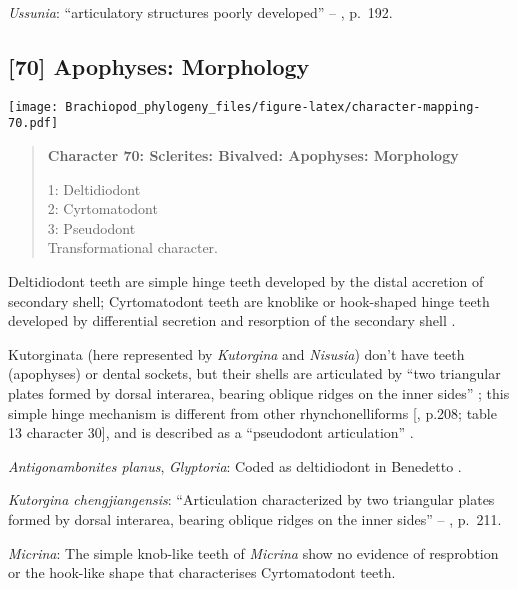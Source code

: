 \documentclass[openany]{book}
\theoremstyle{definition}
\theoremstyle{definition}
\theoremstyle{definition}
\theoremstyle{remark}
\begin{document}
\hypertarget{Ussunia-coding-69}{}
\emph{Ussunia}: ``articulatory structures poorly developed'' --
\citet{Williams2000LinguliformeaCraniiformea}, p.~192.

\subsection*{{[}70{]} Apophyses: Morphology}\label{apophyses-morphology}

\texttt{[image: Brachiopod\_phylogeny\_files/figure-latex/character-mapping-70.pdf]}

\begin{quote}
\textbf{Character 70: Sclerites: Bivalved: Apophyses: Morphology}

1: Deltidiodont\\
2: Cyrtomatodont\\
3: Pseudodont\\
Transformational character.
\end{quote}

Deltidiodont teeth are simple hinge teeth developed by the distal
accretion of secondary shell; Cyrtomatodont teeth are knoblike or
hook-shaped hinge teeth developed by differential secretion and
resorption of the secondary shell \citep[fig. 322
in][]{Williams1997Introduction}.

Kutorginata (here represented by \emph{Kutorgina} and \emph{Nisusia})
don't have teeth (apophyses) or dental sockets, but their shells are
articulated by ``two triangular plates formed by dorsal interarea,
bearing oblique ridges on the inner sides''
\citep[p.~211]{Williams2000LinguliformeaCraniiformea}; this simple hinge
mechanism is different from other rhynchonelliforms
{[}\citet{Williams2000LinguliformeaCraniiformea}, p.208; table 13
character 30{]}, and is described as a ``pseudodont articulation''
\citep{Holmer2018Evolutionarysignificance}.

\hypertarget{Antigonambonites_planus-coding-70}{}
\emph{Antigonambonites planus}, \emph{Glyptoria}: Coded as deltidiodont
in Benedetto \citeyearpar{Benedetto2009iChaniella}.

\hypertarget{Kutorgina_chengjiangensis-coding-70}{}
\emph{Kutorgina chengjiangensis}: ``Articulation characterized by two
triangular plates formed by dorsal interarea, bearing oblique ridges on
the inner sides'' -- \citet{Williams2000LinguliformeaCraniiformea},
p.~211.

\hypertarget{Micrina-coding-70}{}
\emph{Micrina}: The simple knob-like teeth of \emph{Micrina} show no
evidence of resprobtion or the hook-like shape that characterises
Cyrtomatodont teeth.
\end{document}
